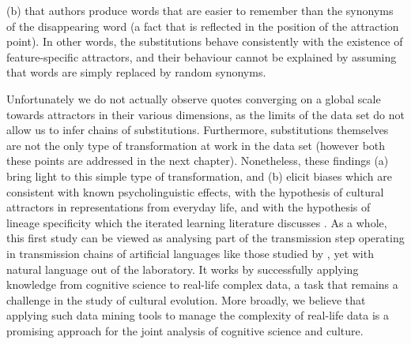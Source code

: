 \documentclass[english,]{article}
\begin{document}
(b) that authors produce words that are easier to remember than the synonyms of the disappearing word (a fact that is reflected in the position of the attraction point).
In other words, the substitutions behave consistently with the existence of feature-specific attractors, and their behaviour cannot be explained by assuming that words are simply replaced by random synonyms.

Unfortunately we do not actually observe quotes converging on a global scale towards attractors in their various dimensions, as the limits of the data set do not allow us to infer chains of substitutions.
Furthermore, substitutions themselves are not the only type of transformation at work in the data set (however both these points are addressed in the next chapter).
Nonetheless, these findings (a) bring light to this simple type of transformation, and (b) elicit biases which are consistent with known psycholinguistic effects, with the hypothesis of cultural attractors in representations from everyday life, and with the hypothesis of lineage specificity which the iterated learning literature discusses \autocites{claidiere_cultural_2014,cornish_systems_2013}.
As a whole, this first study can be viewed as analysing part of the transmission step operating in transmission chains of artificial languages like those studied by \textcite{kirby_cumulative_2008}, yet with natural language out of the laboratory.
It works by successfully applying knowledge from cognitive science to real-life complex data, a task that remains a challenge in the study of cultural evolution.
More broadly, we believe that applying such data mining tools to manage the complexity of real-life data is a promising approach for the joint analysis of cognitive science and culture.
\end{document}
